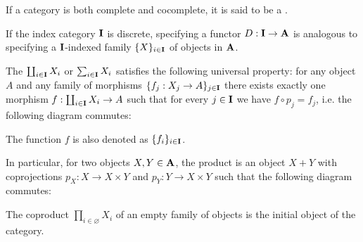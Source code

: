 \begin{definition}\label{def:cocomplete_category}
  If a category is both complete and cocomplete, it is said to be a .
\end{definition}

\begin{definition}\label{def:categorical_coproduct}\cite[definition 5.2.2]{Leinster2014}
  If the index category \( \operatorname{\mathbf{I}} \) is discrete, specifying a functor \( D: \operatorname{\mathbf{I}} \to \operatorname{\mathbf{A}} \) is analogous to specifying a \( \operatorname{\mathbf{I}} \)-indexed family \( \{ X \}_{i \in \operatorname{\mathbf{I}}} \) of objects in \( \operatorname{\mathbf{A}} \).

  The  \( \coprod_{i \in \operatorname{\mathbf{I}}} X_i \) or  \( \sum_{i \in \operatorname{\mathbf{I}}} X_i \) satisfies the following universal property: for any object \( A \) and any family of morphisms \( \{ f_j: {X_j} \to A \}_{j \in \operatorname{\mathbf{I}}} \) there exists exactly one morphism \( f: \coprod_{i \in \operatorname{\mathbf{I}}} X_i \to A \) such that for every \( j \in \operatorname{\mathbf{I}} \) we have \( f \circ p_j = f_j \), i.e. the following diagram commutes:
  \begin{Center}
  \end{Center}

  The function \( f \) is also denoted as \( \{ f_i \}_{i \in \operatorname{\mathbf{I}}} \).

  In particular, for two objects \( X, Y \in \operatorname{\mathbf{A}} \), the product is an object \( X + Y \) with coprojections \( p_X: X \to X \times Y \) and \( p_Y: Y \to X \times Y \) such that the following diagram commutes:
  \begin{Center}
  \end{Center}
\end{definition}

\begin{note}\label{note:empty_categorical_coproduct}
  The coproduct \( \prod_{i \in \varnothing} X_i \) of an empty family of objects is the initial object of the category.
\end{note}

